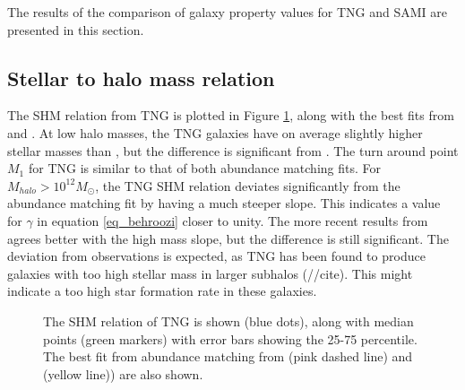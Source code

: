 The results of the comparison of galaxy property values for TNG and SAMI are presented in this section. 

\subsection{Stellar to halo mass relation}
The SHM relation from TNG is plotted in Figure \ref{shmr_res}, along with the best fits from \textcite{Behroozi2013} and \textcite{Zanisi2019}. At low halo masses, the TNG galaxies have on average slightly higher stellar masses than \textcite{Behroozi2013}, but the difference is significant from \textcite{Zanisi2019}. The turn around point $M_1$ for TNG is similar to that of both abundance matching fits. For $M_{halo} > 10^{12} M_{\odot}$, the TNG SHM relation deviates significantly from the abundance matching fit by having a much steeper slope. This indicates a value for $\gamma$ in equation \ref{eq_behroozi} closer to unity. The more recent results from \textcite{Zanisi2019} agrees better with the high mass slope, but the difference is still significant. The deviation from observations is expected, as TNG has been found to produce galaxies with too high stellar mass in larger subhalos (//cite). This might indicate a too high star formation rate in these galaxies.


\begin{figure}
    \centering
    \caption{The SHM relation of TNG is shown (blue dots), along with median points (green markers) with error bars showing the 25-75 percentile. The best fit from abundance matching from \textcite{Behroozi2013} (pink dashed line) and \textcite{Zanisi2019} (yellow line)) are also shown.} 
    \label{shmr_res}
\end{figure}


